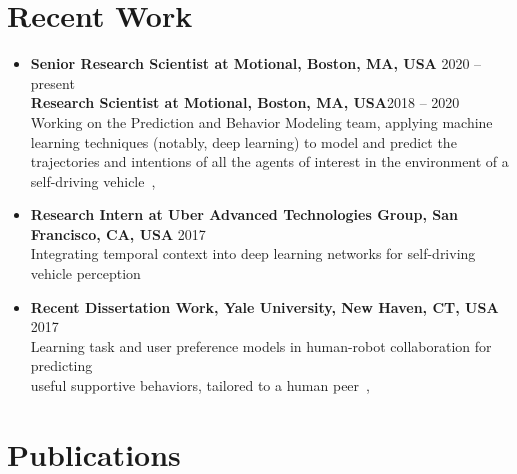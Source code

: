 \documentclass[10pt,letterpaper]{article}
\newcommand{\thing}[2]{{#1} \hfill {#2}}
\begin{document}
\section{Recent Work}
\begin{itemize}%
\item \thing{\bf Senior Research Scientist at Motional, Boston, MA, USA}{2020 -- present}\\
 	{\bf Research Scientist at Motional, Boston, MA, USA}\hfill{2018  --  \hspace{2.8mm} 2020}\vspace{0.5em}\\
      	Working on the Prediction and Behavior Modeling team, applying machine learning techniques (notably, deep learning) to model and predict the trajectories and intentions of all the agents of interest in the environment of a self-driving vehicle~\cite{grigore2020covernet}, \cite{grigore2020self_driving_domain_knowledge}
\item \thing{\bf Research Intern at Uber Advanced Technologies Group, San Francisco, CA, USA}{2017}\\
      	Integrating temporal context into deep learning networks for self-driving vehicle perception 
\item \thing{\bf Recent Dissertation Work, Yale University, New Haven, CT, USA}{2017}\\
	Learning task and user preference models in human-robot collaboration for predicting \\ useful supportive behaviors, tailored to a human peer~\cite{grigore2018pref_assistance}, \cite{grigore2018predict_supportive}
\end{itemize}

\section{Publications}
\nocite{*} %
\setlength{\biblabelsep}{0.5em} %
\printbibliography[heading=none,keyword=publication]

\end{document}
